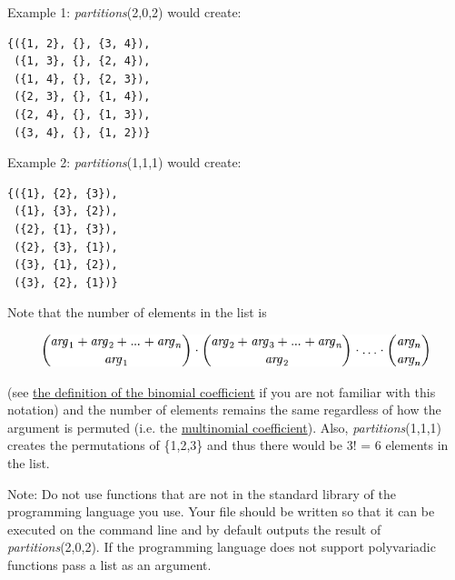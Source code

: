 Example 1:
\emph{p}\emph{a}\emph{r}\emph{t}\emph{i}\emph{t}\emph{i}\emph{o}\emph{n}\emph{s}(2,0,2)
would create:

\begin{verbatim}
{({1, 2}, {}, {3, 4}), 
 ({1, 3}, {}, {2, 4}), 
 ({1, 4}, {}, {2, 3}), 
 ({2, 3}, {}, {1, 4}), 
 ({2, 4}, {}, {1, 3}), 
 ({3, 4}, {}, {1, 2})}
\end{verbatim}

Example 2:
\emph{p}\emph{a}\emph{r}\emph{t}\emph{i}\emph{t}\emph{i}\emph{o}\emph{n}\emph{s}(1,1,1)
would create:

\begin{verbatim}
{({1}, {2}, {3}), 
 ({1}, {3}, {2}), 
 ({2}, {1}, {3}), 
 ({2}, {3}, {1}), 
 ({3}, {1}, {2}), 
 ({3}, {2}, {1})}
\end{verbatim}

Note that the number of elements in the list is

\begin{figure}[H]
\centering
\includegraphics[scale=.6]{graphics/05e249cad1085102aca0ad06c5eb4236.png}
\end{figure}

(see \href{http://en.wikipedia.org/wiki/Binomial\_coefficient}{the
definition of the binomial coefficient} if you are not familiar with
this notation) and the number of elements remains the same regardless of
how the argument is permuted (i.e. the
\href{http://en.wikipedia.org/wiki/Multinomial\_coefficient}{multinomial
coefficient}). Also,
\emph{p}\emph{a}\emph{r}\emph{t}\emph{i}\emph{t}\emph{i}\emph{o}\emph{n}\emph{s}(1,1,1)
creates the permutations of \{1,2,3\} and thus there would be 3! = 6
elements in the list.

Note: Do not use functions that are not in the standard library of the
programming language you use. Your file should be written so that it can
be executed on the command line and by default outputs the result of
\emph{p}\emph{a}\emph{r}\emph{t}\emph{i}\emph{t}\emph{i}\emph{o}\emph{n}\emph{s}(2,0,2).
If the programming language does not support polyvariadic functions pass
a list as an argument.

